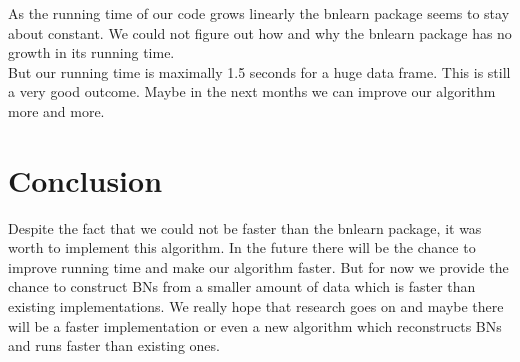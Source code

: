 
	As the running time of our code grows linearly the bnlearn package seems to stay about constant. We could not figure out how and why the bnlearn package has no growth in its running time.\\
	But our running time is maximally 1.5 seconds for a huge data frame. This is still a very good outcome. Maybe in the next months we can improve our algorithm more and more.



\chapter{Conclusion}

	Despite the fact that we could not be faster than the bnlearn package, it was worth to implement this algorithm. In the future there will be the chance to improve running time and make our algorithm faster. But for now we provide the chance to construct BNs from a smaller amount of data which is faster than existing implementations. We really hope that research goes on and maybe there will be a faster implementation or even a new algorithm which reconstructs BNs and runs faster than existing ones.


